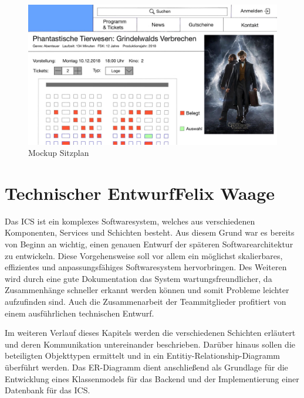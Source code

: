 		\begin{figure}[H]
			\centering 
			\includegraphics[width=12cm]{img/mockUp3.png}
			\captionsetup{format=hang}
			\caption[Mockup Sitzplan]{\label{fig:mockUpSitzplan} Mockup Sitzplan }
		\end{figure}
		
		
	
	\section[Technischer Entwurf]{Technischer Entwurf{\hfill \normalsize Felix Waage}} \label{chapter:technischer_entwurf}

		Das \ac{ICS} ist ein komplexes Softwaresystem, welches aus verschiedenen Komponenten, Services und Schichten besteht. Aus diesem Grund war es bereits von Beginn an wichtig, einen genauen Entwurf der späteren Softwarearchitektur zu entwickeln. Diese Vorgehensweise soll vor allem ein möglichst skalierbares, effizientes und anpassungsfähiges Softwaresystem hervorbringen. Des Weiteren wird durch eine gute Dokumentation das System wartungsfreundlicher, da Zusammenhänge schneller erkannt werden können und somit Probleme leichter aufzufinden sind. Auch die Zusammenarbeit der Teammitglieder profitiert von einem ausführlichen technischen Entwurf.
		
			Im weiteren Verlauf dieses Kapitels werden die verschiedenen Schichten erläutert und deren Kommunikation untereinander beschrieben. Darüber hinaus sollen die beteiligten Objekttypen ermittelt und in ein Entitiy-Relationship-Diagramm überführt werden. Das ER-Diagramm dient anschließend als Grundlage für die Entwicklung eines Klassenmodels für das Backend und der Implementierung einer Datenbank für das ICS. 
			
